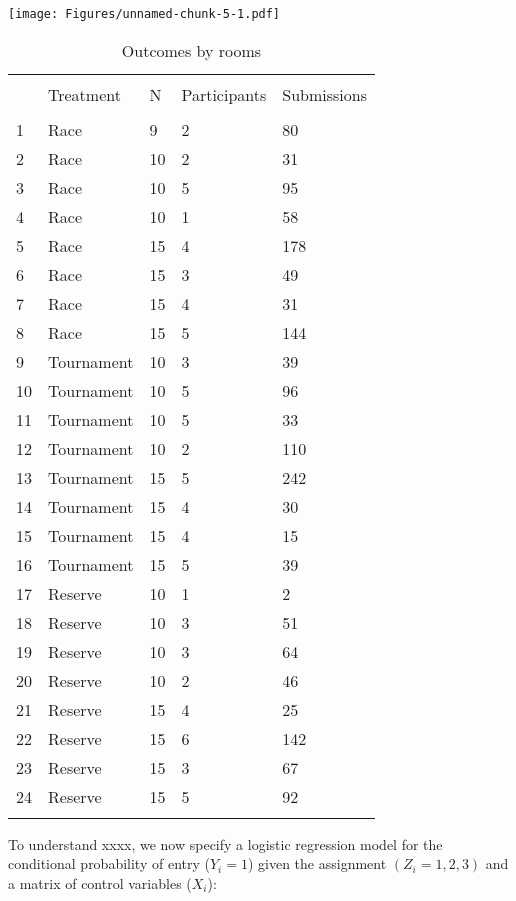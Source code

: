 \documentclass[11pt, titlepage]{article}
\begin{document}
\texttt{[image: Figures/unnamed-chunk-5-1.pdf]}

\begin{table}
\centering
\caption{Outcomes by rooms}
\label{outcomes}
\begin{tabular}{@{}lm{2cm}m{2cm}m{2cm}m{2cm}}
  \\[-1.8ex]\hline\hline\\[-1.8ex]
 & Treatment & N & Participants & Submissions \\ 
  \hline\\[-1.86ex]
1 & Race & 9 & 2 & 80 \\ 
  2 & Race & 10 & 2 & 31 \\ 
  3 & Race & 10 & 5 & 95 \\ 
  4 & Race & 10 & 1 & 58 \\ 
  5 & Race & 15 & 4 & 178 \\ 
  6 & Race & 15 & 3 & 49 \\ 
  7 & Race & 15 & 4 & 31 \\ 
  8 & Race & 15 & 5 & 144 \\ 
  9 & Tournament & 10 & 3 & 39 \\ 
  10 & Tournament & 10 & 5 & 96 \\ 
  11 & Tournament & 10 & 5 & 33 \\ 
  12 & Tournament & 10 & 2 & 110 \\ 
  13 & Tournament & 15 & 5 & 242 \\ 
  14 & Tournament & 15 & 4 & 30 \\ 
  15 & Tournament & 15 & 4 & 15 \\ 
  16 & Tournament & 15 & 5 & 39 \\ 
  17 & Reserve & 10 & 1 & 2 \\ 
  18 & Reserve & 10 & 3 & 51 \\ 
  19 & Reserve & 10 & 3 & 64 \\ 
  20 & Reserve & 10 & 2 & 46 \\ 
  21 & Reserve & 15 & 4 & 25 \\ 
  22 & Reserve & 15 & 6 & 142 \\ 
  23 & Reserve & 15 & 3 & 67 \\ 
  24 & Reserve & 15 & 5 & 92 \\ 
   \hline\\[-1.8ex]
\end{tabular}
\end{table}

To understand xxxx, we now specify a logistic regression model for the
conditional probability of entry (\(Y_i=1\)) given the assignment
\((Z_i=1,2,3)\) and a matrix of control variables (\(X_i\)):
\end{document}
